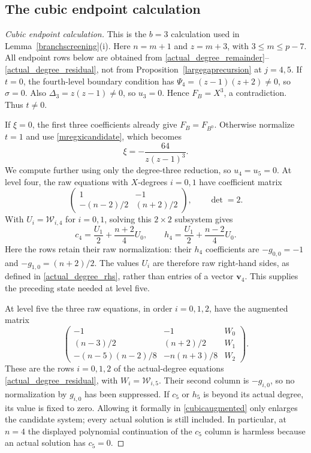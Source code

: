 \documentclass[10pt,a4paper]{amsart}
\begin{document}
\subsection{The cubic endpoint calculation}\label{app:cubic}

\begin{proof}[Cubic endpoint calculation]
This is the $b=3$ calculation used in
Lemma~\ref{branchscreening}(i).  Here $n=m+1$ and $z=m+3$, with
$3\le m\le p-7$.  All endpoint rows below are obtained from
\eqref{actual_degree_remainder}--\eqref{actual_degree_residual}, not
from Proposition~\ref{largegaprecursion} at $j=4,5$.
If $t=0$, the fourth-level boundary condition has
$\Psi_4=(z-1)(z+2)\ne0$, so $\sigma=0$.
Also $\Delta_3=z(z-1)\ne0$, so $u_3=0$.  Hence $F_B=X^3$, a
contradiction.  Thus $t\ne0$.

If $\xi=0$, the first three coefficients already give
$F_B=F_{B^0}$.  Otherwise normalize $t=1$ and use
\eqref{mregxicandidate}, which becomes
\begin{equation}\label{cubicxicandidate}
 \xi=-\frac{64}{z(z-1)^3}.
\end{equation}
We compute further using only the degree-three reduction, so
$u_4=u_5=0$.  At level four, the raw equations with $X$-degrees $i=0,1$ have
coefficient matrix
\[
 \begin{pmatrix}1&-1\\-(n-2)/2&(n+2)/2\end{pmatrix},
 \qquad \det=2.
\]
With $U_i=\mathcal W_{i,4}$ for $i=0,1$, solving this
$2\times2$ subsystem gives
\[
 c_4=\frac{U_1}{2}+\frac{n+2}{4}U_0,\qquad
 h_4=\frac{U_1}{2}+\frac{n-2}{4}U_0.
\]
Here the rows retain their raw normalization: their $h_4$
coefficients are $-g_{0,0}=-1$ and $-g_{1,0}=(n+2)/2$.
The values $U_i$ are therefore raw right-hand sides, as defined in
\eqref{actual_degree_rhs}, rather than entries of a vector $\mathbf v_4$.
This supplies the preceding state needed at level five.

At level five the three raw equations, in order $i=0,1,2$, have the
augmented matrix
\begin{equation}\label{cubicaugmented}
 \begin{pmatrix}
 -1&-1&W_0\\[1mm]
 (n-3)/2&(n+2)/2&W_1\\[1mm]
 -(n-5)(n-2)/8&-n(n+3)/8&W_2
 \end{pmatrix}.
\end{equation}
These are the rows $i=0,1,2$ of the actual-degree equations
\eqref{actual_degree_residual}, with $W_i=\mathcal W_{i,5}$.
Their second column is $-g_{i,0}$, so no normalization by $g_{i,0}$
has been suppressed.  If $c_5$ or $h_5$ is beyond its actual degree,
its value is fixed to zero.  Allowing it formally in
\eqref{cubicaugmented} only enlarges the candidate system; every actual
solution is still included.  In particular, at $n=4$ the displayed
polynomial continuation of the $c_5$ column is harmless because an
actual solution has $c_5=0$.


\end{proof}
\end{document}
